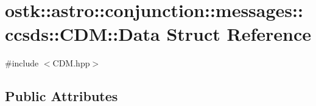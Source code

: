 \hypertarget{structostk_1_1astro_1_1conjunction_1_1messages_1_1ccsds_1_1_c_d_m_1_1_data}{}\section{ostk\+:\+:astro\+:\+:conjunction\+:\+:messages\+:\+:ccsds\+:\+:C\+DM\+:\+:Data Struct Reference}
\label{structostk_1_1astro_1_1conjunction_1_1messages_1_1ccsds_1_1_c_d_m_1_1_data}


{\ttfamily \#include $<$C\+D\+M.\+hpp$>$}

\subsection*{Public Attributes}
